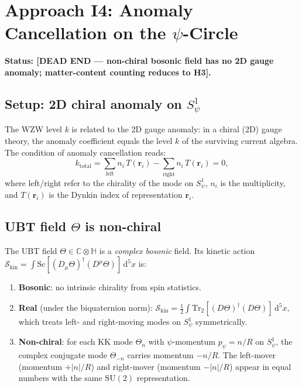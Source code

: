 \documentclass[11pt,a4paper]{article}
\theoremstyle{definition}
\theoremstyle{remark}
\begin{document}
\section{Approach I4: Anomaly Cancellation on the \texorpdfstring{$\psi$}{psi}-Circle}
\label{sec:I4}

\textbf{Status: [DEAD END — non-chiral bosonic field has no 2D gauge
anomaly; matter-content counting reduces to H3].}

\subsection{Setup: 2D chiral anomaly on $S^1_\psi$}

The WZW level $k$ is related to the 2D gauge anomaly:
in a chiral (2D) gauge theory, the anomaly coefficient equals the
level $k$ of the surviving current algebra.  The condition of anomaly
cancellation reads:
\begin{equation}
  k_{\mathrm{total}} = \sum_{\text{left}} n_i\,T(\mathbf{r}_i)
    - \sum_{\text{right}} n_i\,T(\mathbf{r}_i) = 0,
  \label{eq:anomaly_cancel}
\end{equation}
where left/right refer to the chirality of the mode on $S^1_\psi$,
$n_i$ is the multiplicity, and $T(\mathbf{r}_i)$ is the Dynkin index
of representation $\mathbf{r}_i$.

\subsection{UBT field \texorpdfstring{$\Theta$}{Theta} is non-chiral}

The UBT field $\Theta \in \mathbb{C}\otimes\mathbb{H}$ is a
\emph{complex bosonic} field.  Its kinetic action
$\mathcal{S}_{\mathrm{kin}} = \int \mathrm{Sc}[(D_\mu\Theta)^\dagger(D^\mu\Theta)]\,\mathrm{d}^5x$
is:
\begin{enumerate}
  \item \textbf{Bosonic}: no intrinsic chirality from spin statistics.
  \item \textbf{Real} (under the biquaternion norm): $\mathcal{S}_{\mathrm{kin}}
    = \frac{1}{2}\int \mathrm{Tr}_2[(D\Theta)^\dagger(D\Theta)]\,\mathrm{d}^5x$,
    which treats left- and right-moving modes on $S^1_\psi$ symmetrically.
  \item \textbf{Non-chiral}: for each KK mode $\Theta_n$ with
    $\psi$-momentum $p_\psi = n/R$ on $S^1_\psi$, the complex conjugate
    mode $\Theta_{-n}$ carries momentum $-n/R$.
    The left-mover (momentum $+|n|/R$) and right-mover (momentum $-|n|/R$)
    appear in equal numbers with the same $\mathrm{SU}(2)$ representation.
\end{enumerate}
\end{document}
